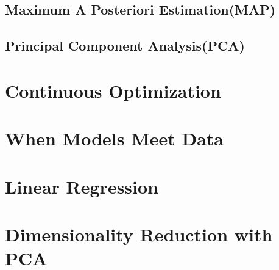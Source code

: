 \documentclass[12pt,openany]{book}
\theoremstyle{definition}
\begin{document}
	\section{Maximum A Posteriori Estimation(MAP)}
	\section{Principal Component Analysis(PCA)}
	
	\chapter{Continuous Optimization}
	
	\chapter{When Models Meet Data}
	
	\chapter{Linear Regression}
	
	\chapter{Dimensionality Reduction with PCA}
\end{document}

